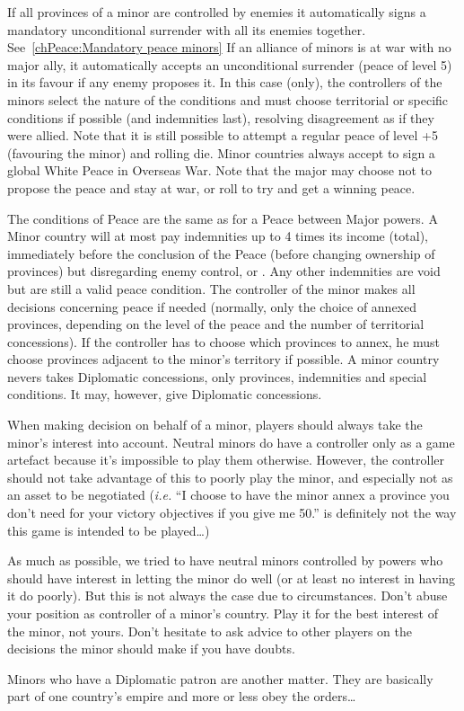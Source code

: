\label{chPeace:automatic peace minor}
\bparag If all provinces of a minor are controlled by enemies it automatically
signs a mandatory unconditional surrender with all its enemies together.
See~\ref{chPeace:Mandatory peace minors}
\bparag If an alliance of minors is at war with no major ally, it
automatically accepts an unconditional surrender (peace of level 5) in its
favour if any enemy proposes it. In this case (only), the controllers of the
minors select the nature of the conditions and must choose territorial or
specific conditions if possible (and indemnities last), resolving disagreement
as if they were allied. Note that it is still possible to attempt a regular
peace of level +5 (favouring the minor) and rolling die.
\bparag Minor countries always accept to sign a global White Peace in Overseas
War. Note that the major may choose not to propose the peace and stay at war,
or roll to try and get a winning peace.

\bparag The conditions of Peace are the same as for a Peace between Major
powers.
\bparag A Minor country will at most pay indemnities up to 4 times its income
(total), immediately before the conclusion of the Peace (before changing
ownership of provinces) but disregarding enemy control, \REVOLT or
\PILLAGE. Any other indemnities are void but are still a valid peace
condition.
\bparag The controller of the minor makes all decisions concerning peace if
needed (normally, only the choice of annexed provinces, depending on the level
of the peace and the number of territorial concessions). If the controller has
to choose which provinces to annex, he must choose provinces adjacent to the
minor's territory if possible.
\bparag A minor country nevers takes Diplomatic concessions, only provinces,
indemnities and special conditions. It may, however, give Diplomatic
concessions.

\begin{designnote}
  When making decision on behalf of a minor, players should always take the
  minor's interest into account. Neutral minors do have a controller only as a
  game artefact because it's impossible to play them otherwise. However, the
  controller should not take advantage of this to poorly play the minor, and
  especially not as an asset to be negotiated (\emph{i.e.} ``I choose to have
  the minor annex a province you don't need for your victory objectives if you
  give me 50\ducats.'' is definitely not the way this game is intended to be
  played\ldots)

  As much as possible, we tried to have neutral minors controlled by powers
  who should have interest in letting the minor do well (or at least no
  interest in having it do poorly). But this is not always the case due to
  circumstances. Don't abuse your position as controller of a minor's
  country. Play it for the best interest of the minor, not yours. Don't
  hesitate to ask advice to other players on the decisions the minor should
  make if you have doubts.

  Minors who have a Diplomatic patron are another matter. They are basically
  part of one country's empire and more or less obey the orders\ldots
\end{designnote}

